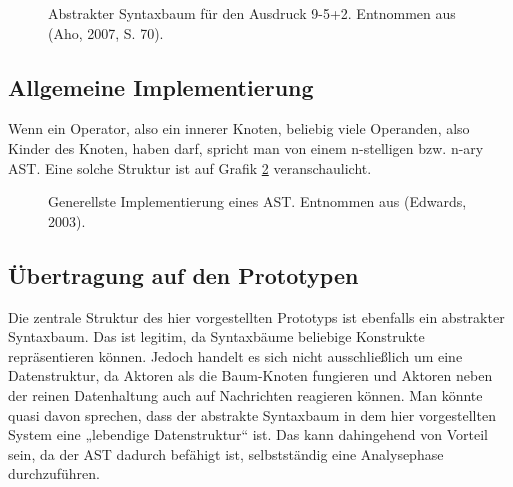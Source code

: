  
\begin{figure}[h!]
\centering
\advance\leftskip-2.5cm
\caption{ Abstrakter Syntaxbaum für den Ausdruck 9-5+2. Entnommen aus (Aho, 2007, S. 70). }\label{ast}
\end{figure}
 
\subsection{Allgemeine Implementierung}\label{}
 
Wenn ein Operator, also ein innerer Knoten, beliebig viele Operanden, also Kinder des Knoten, haben darf, spricht man von einem n-stelligen bzw. n-ary AST. \citep{Edwards} Eine solche Struktur ist auf Grafik \ref{astimpl} veranschaulicht.

 
\begin{figure}[h!]
\centering
\advance\leftskip-2.5cm
\caption{ Generellste Implementierung eines AST. Entnommen aus (Edwards, 2003). }\label{astimpl}
\end{figure}
 
\subsection{Übertragung auf den Prototypen}\label{}
 
Die zentrale Struktur des hier vorgestellten Prototyps ist ebenfalls ein abstrakter Syntaxbaum. Das ist legitim, da Syntaxbäume beliebige Konstrukte repräsentieren können. Jedoch handelt es sich nicht ausschließlich um eine Datenstruktur, da Aktoren als die Baum-Knoten fungieren und Aktoren neben der reinen Datenhaltung auch auf Nachrichten reagieren können. Man könnte quasi davon sprechen, dass der abstrakte Syntaxbaum in dem hier vorgestellten System eine „lebendige Datenstruktur“ ist. Das kann dahingehend von Vorteil sein, da der AST dadurch befähigt ist, selbstständig eine Analysephase durchzuführen.

